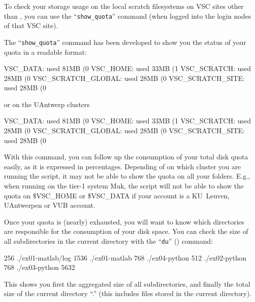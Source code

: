 To check your storage usage on the local scratch filesystems on VSC sites other than \university,
you can use the ``\texttt{show\_quota}'' command (when logged into the login nodes of that VSC site).

\else  %

The ``\texttt{show\_quota}'' command has been developed to show you the
status of your quota in a readable format:

\begin{prompt}
VSC_DATA:    used 81MB (0%
VSC_HOME:    used 33MB (1%
VSC_SCRATCH:   used 28MB (0%
VSC_SCRATCH_GLOBAL: used 28MB (0%
VSC_SCRATCH_SITE:   used 28MB (0%
\end{prompt}

or on the UAntwerp clusters

\begin{prompt}
VSC_DATA:    used 81MB (0%
VSC_HOME:    used 33MB (1%
VSC_SCRATCH:   used 28MB (0%
VSC_SCRATCH_GLOBAL: used 28MB (0%
VSC_SCRATCH_SITE:   used 28MB (0%
\end{prompt}


With this command, you can follow up the consumption of your total disk quota
easily, as it is expressed in percentages. Depending of on which cluster you are
running the script, it may not be able to show the quota on all your folders.
E.g., when running on the tier-1 system Muk, the script will not be able to show
the quota on \$VSC\_HOME or \$VSC\_DATA if your account is a KU~Leuven, UAntwerpen or VUB account.

\fi  %

Once your quota is (nearly) exhausted, you will want to know which directories
are responsible for the consumption of your disk space. You can check the size
of all subdirectories in the current directory with the ``\texttt{du}'' () command:

\begin{prompt}
256 ./ex01-matlab/log
1536 ./ex01-matlab
768 ./ex04-python
512 ./ex02-python
768 ./ex03-python
5632
\end{prompt}

This shows you first the aggregated size of all subdirectories, and finally the
total size of the current directory ``.'' (this includes files stored in the
current directory).


